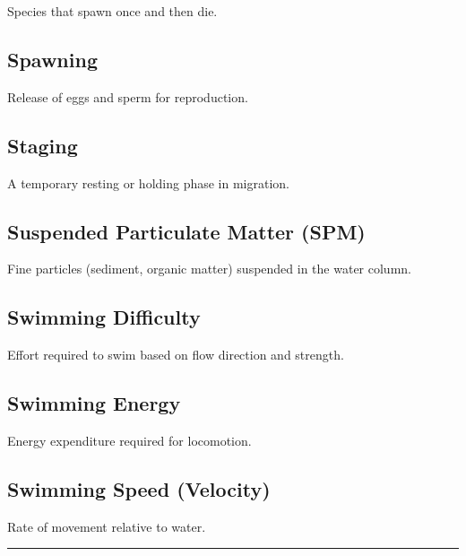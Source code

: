 \documentclass[
]{book}
\begin{document}
Species that spawn once and then die.

\subsection{\texorpdfstring{\textbf{Spawning}}{Spawning}}\label{spawning}

Release of eggs and sperm for reproduction.

\subsection{\texorpdfstring{\textbf{Staging}}{Staging}}\label{staging}

A temporary resting or holding phase in migration.

\subsection{\texorpdfstring{\textbf{Suspended Particulate Matter (SPM)}}{Suspended Particulate Matter (SPM)}}\label{suspended-particulate-matter-spm}

Fine particles (sediment, organic matter) suspended in the water column.

\subsection{\texorpdfstring{\textbf{Swimming Difficulty}}{Swimming Difficulty}}\label{swimming-difficulty-2}

Effort required to swim based on flow direction and strength.

\subsection{\texorpdfstring{\textbf{Swimming Energy}}{Swimming Energy}}\label{swimming-energy-2}

Energy expenditure required for locomotion.

\subsection{\texorpdfstring{\textbf{Swimming Speed (Velocity)}}{Swimming Speed (Velocity)}}\label{swimming-speed-velocity}

Rate of movement relative to water.

\begin{center}\rule{0.5\linewidth}{0.5pt}\end{center}
\end{document}
